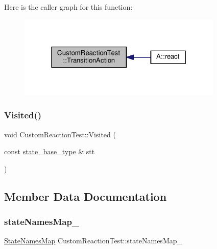 Here is the caller graph for this function\+:
\nopagebreak
\begin{figure}[H]
\begin{center}
\leavevmode
\includegraphics[width=277pt]{struct_custom_reaction_test_ac5e80e655da98aec51957072fa2d74bc_icgraph}
\end{center}
\end{figure}
\mbox{\label{struct_custom_reaction_test_ae8d89bbec1c549a54af1980e282367a9}} 
\subsubsection{\texorpdfstring{Visited()}{Visited()}}
{\footnotesize\ttfamily void Custom\+Reaction\+Test\+::\+Visited (\begin{DoxyParamCaption}\item[{const \mbox{\hyperlink{classboost_1_1statechart_1_1state__machine_a69cc258c29fcabec25c5dc8bedb7d530}{state\+\_\+base\+\_\+type}} \&}]{stt }\end{DoxyParamCaption})\hspace{0.3cm}{\ttfamily [inline]}}



\subsection{Member Data Documentation}
\mbox{\label{struct_custom_reaction_test_a1d740df93c873477361c2951b768aa84}} 
\subsubsection{\texorpdfstring{state\+Names\+Map\+\_\+}{stateNamesMap\_}}
{\footnotesize\ttfamily \mbox{\hyperlink{struct_custom_reaction_test_a0910113d8f9548d106ad7bf63a3fa136}{State\+Names\+Map}} Custom\+Reaction\+Test\+::state\+Names\+Map\+\_\+\hspace{0.3cm}{\ttfamily [private]}}

